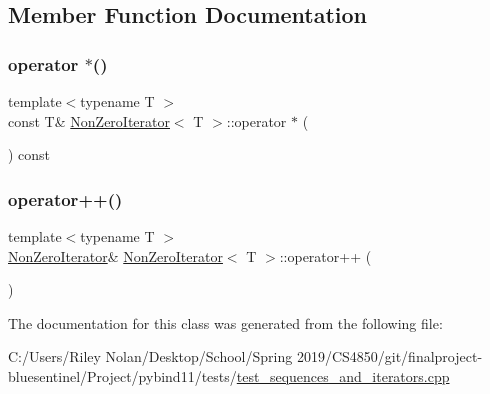 \subsection{Member Function Documentation}
\mbox{\label{class_non_zero_iterator_a86d4ce2584b1b4bad0babcf4a715431c}} 
\subsubsection{\texorpdfstring{operator $\ast$()}{operator *()}}
{\footnotesize\ttfamily template$<$typename T $>$ \\
const T\& \mbox{\hyperlink{class_non_zero_iterator}{Non\+Zero\+Iterator}}$<$ T $>$\+::operator $\ast$ (\begin{DoxyParamCaption}{ }\end{DoxyParamCaption}) const\hspace{0.3cm}{\ttfamily [inline]}}

\mbox{\label{class_non_zero_iterator_a236074caae79b4249146d69a66d91511}} 
\subsubsection{\texorpdfstring{operator++()}{operator++()}}
{\footnotesize\ttfamily template$<$typename T $>$ \\
\mbox{\hyperlink{class_non_zero_iterator}{Non\+Zero\+Iterator}}\& \mbox{\hyperlink{class_non_zero_iterator}{Non\+Zero\+Iterator}}$<$ T $>$\+::operator++ (\begin{DoxyParamCaption}{ }\end{DoxyParamCaption})\hspace{0.3cm}{\ttfamily [inline]}}



The documentation for this class was generated from the following file\+:\begin{DoxyCompactItemize}
\item 
C\+:/\+Users/\+Riley Nolan/\+Desktop/\+School/\+Spring 2019/\+C\+S4850/git/finalproject-\/bluesentinel/\+Project/pybind11/tests/\mbox{\hyperlink{test__sequences__and__iterators_8cpp}{test\+\_\+sequences\+\_\+and\+\_\+iterators.\+cpp}}\end{DoxyCompactItemize}
